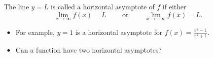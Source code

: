 \begin{frame}
\begin{definition}
The line $y = L$ is called a horizontal asymptote of $f$ if either
\[
\lim_{x\to \infty}f(x) = L \qquad \text{ or } \qquad \lim_{x\to - \infty} f(x) = L.
\]
\end{definition}
\begin{itemize}
\item<2->  For example, $y = 1$ is a horizontal asymptote for $f(x) = \frac{x^2-1}{x^2+1}$.%
\item<3->  Can a function have two horizontal asymptotes?  \alert<handout:0| 4>{}%
\end{itemize}
%
\end{frame}
